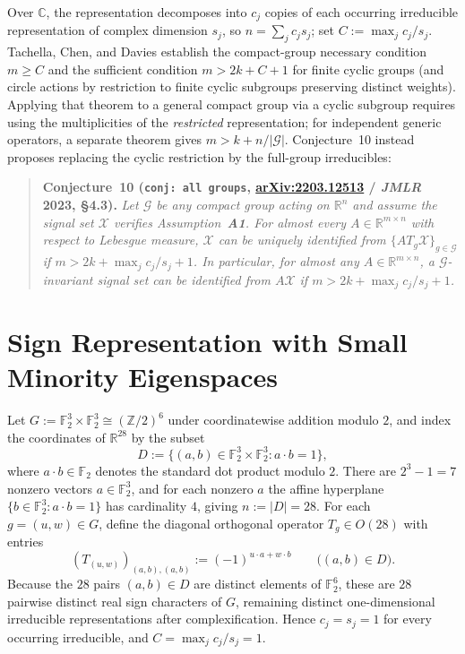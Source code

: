 \documentclass[11pt]{article}
\theoremstyle{plain}
\theoremstyle{definition}
\theoremstyle{remark}
\begin{document}
Over $\mathbb{C}$, the representation decomposes into $c_j$ copies of each occurring irreducible representation of complex dimension $s_j$, so $n = \sum_j c_j s_j$; set $C := \max_j c_j / s_j$.
Tachella, Chen, and Davies establish the compact-group necessary condition $m \ge C$ and the sufficient condition $m > 2k + C + 1$ for finite cyclic groups (and circle actions by restriction to finite cyclic subgroups preserving distinct weights).
Applying that theorem to a general compact group via a cyclic subgroup requires using the multiplicities of the \emph{restricted} representation; for independent generic operators, a separate theorem gives $m > k + n/|\mathcal{G}|$.
Conjecture~10 instead proposes replacing the cyclic restriction by the full-group irreducibles:

\begin{quote}
\textbf{Conjecture~10 (\texttt{conj: all groups}, \href{https://arxiv.org/abs/2203.12513}{arXiv:2203.12513} / \emph{JMLR} 2023, \S4.3).}
\emph{Let $\mathcal{G}$ be any compact group acting on $\mathbb{R}^n$ and assume the signal set $\mathcal{X}$ verifies Assumption~\textup{\textbf{A1}}. For almost every $A \in \mathbb{R}^{m \times n}$ with respect to Lebesgue measure, $\mathcal{X}$ can be uniquely identified from $\{A T_g \mathcal{X}\}_{g \in \mathcal{G}}$ if $m > 2k + \max_j c_j/s_j + 1$. In particular, for almost any $A \in \mathbb{R}^{m \times n}$, a $\mathcal{G}$-invariant signal set can be identified from $A\mathcal{X}$ if $m > 2k + \max_j c_j/s_j + 1$.}
\end{quote}

\section{Sign Representation with Small Minority Eigenspaces}

Let $G := \mathbb{F}_2^3 \times \mathbb{F}_2^3 \cong (\mathbb{Z}/2)^6$ under coordinatewise addition modulo $2$, and index the coordinates of $\mathbb{R}^{28}$ by the subset
\[
D := \{(a, b) \in \mathbb{F}_2^3 \times \mathbb{F}_2^3 : a \cdot b = 1\},
\]
where $a \cdot b \in \mathbb{F}_2$ denotes the standard dot product modulo $2$.
There are $2^3 - 1 = 7$ nonzero vectors $a \in \mathbb{F}_2^3$, and for each nonzero $a$ the affine hyperplane $\{b \in \mathbb{F}_2^3 : a \cdot b = 1\}$ has cardinality $4$, giving $n := |D| = 28$.
For each $g = (u, w) \in G$, define the diagonal orthogonal operator $T_g \in O(28)$ with entries
\[
(T_{(u,w)})_{(a,b),(a,b)} := (-1)^{u \cdot a + w \cdot b}
\qquad \bigl((a, b) \in D\bigr).
\]
Because the $28$ pairs $(a, b) \in D$ are distinct elements of $\mathbb{F}_2^6$, these are $28$ pairwise distinct real sign characters of $G$, remaining distinct one-dimensional irreducible representations after complexification.
Hence $c_j = s_j = 1$ for every occurring irreducible, and $C = \max_j c_j/s_j = 1$.
\end{document}
